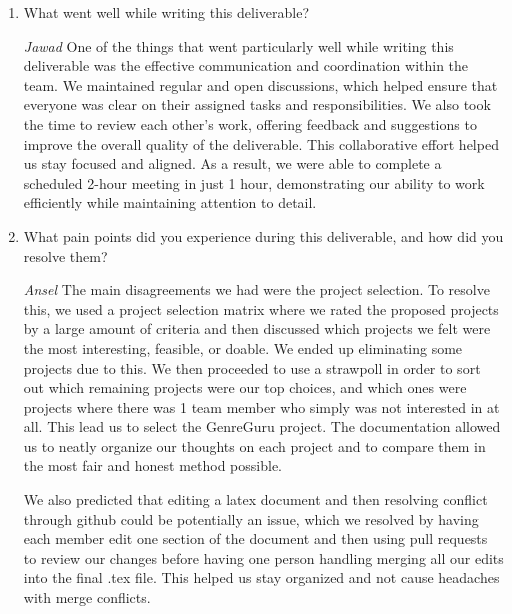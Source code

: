 \documentclass{article}
\begin{document}
\begin{enumerate}
    \item What went well while writing this deliverable?

\emph{Jawad}
One of the things that went particularly well while writing this deliverable was the effective communication and coordination within the team. We maintained regular and open discussions, which helped ensure that everyone was clear on their assigned tasks and responsibilities. We also took the time to review each other's work, offering feedback and suggestions to improve the overall quality of the deliverable. This collaborative effort helped us stay focused and aligned. As a result, we were able to complete a scheduled 2-hour meeting in just 1 hour, demonstrating our ability to work efficiently while maintaining attention to detail.

    \item What pain points did you experience during this deliverable, and how
    did you resolve them?
    
\emph{Ansel}
The main disagreements we had were the project selection. To resolve this, we used a project selection matrix 
where we rated the proposed projects by a large amount of criteria and then discussed which projects we felt
were the most interesting, feasible, or doable. We ended up eliminating some projects due to this. We then proceeded to use a strawpoll in order to sort out which
remaining projects were our top choices, and which ones were projects where there was 1 team member who simply was not
interested in at all. This lead us to select the GenreGuru project. The documentation allowed us to neatly organize our
thoughts on each project and to compare them in the most fair and honest method possible. 

We also predicted that editing a latex
document and then resolving conflict through github could be potentially an issue, which we resolved by having each member 
edit one section of the document and then using pull requests to review our changes before having one person handling merging
all our edits into the final .tex file. This helped us stay organized and not cause headaches with merge conflicts. 


\end{enumerate}
\end{document}
